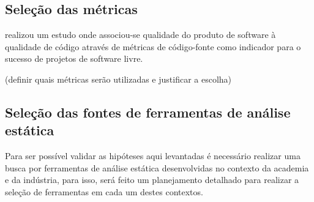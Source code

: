 \documentclass[qual, classic, a4paper]{ufbathesis}
\begin{document}
\subsection{Seleção das métricas}

 realizou um estudo onde associou-se
qualidade do produto de software à qualidade de código através de métricas de
código-fonte como indicador para o sucesso de projetos de software livre.

(definir quais métricas serão utilizadas e justificar a escolha)

%
%
%
%

\subsection{Seleção das fontes de ferramentas de análise estática}

Para ser possível validar as hipóteses aqui levantadas é necessário realizar
uma busca por ferramentas de análise estática desenvolvidas no contexto da
academia e da indústria, para isso, será feito um planejamento detalhado para
realizar a seleção de ferramentas em cada um destes contextos.
\end{document}
